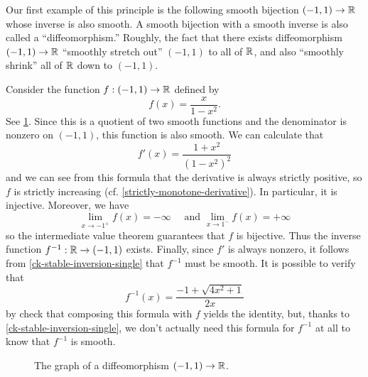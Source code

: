 Our first example of this principle is the following smooth bijection $(-1,1) \to \mathbb{R}$ whose inverse is also smooth. A smooth bijection with a smooth inverse is also called a ``diffeomorphism.'' Roughly, the fact that there exists diffeomorphism $(-1,1) \to \mathbb{R}$ ``smoothly stretch out'' $(-1,1)$ to all of $\mathbb{R}$, and also ``smoothly shrink'' all of $\mathbb{R}$ down to $(-1,1)$. 

\begin{example} \label{interval-to-line}
	Consider the function $f : (-1,1) \to \mathbb{R}$ defined by \[ f(x) = \frac{x}{1-x^2}. \]
	See \cref{interval-to-line-graph}. 
	Since this is a quotient of two smooth functions and the denominator is nonzero on $(-1,1)$, this function is also smooth. We can calculate that
	\[ f'(x) = \frac{1+x^2}{(1-x^2)^2} \]
	and we can see from this formula that the derivative is always strictly positive, so $f$ is strictly increasing (cf. \cref{strictly-monotone-derivative}). In particular, it is injective. Moreover, we have
	\[ \lim_{x \to -1^+} f(x) = -\infty \quad \text{ and } \lim_{x \to 1^-} f(x) = +\infty \]
	so the intermediate value theorem guarantees that $f$ is bijective. Thus the inverse function $f^{-1} : \mathbb{R} \to (-1,1)$ exists. Finally, since $f'$ is always nonzero, it follows from \cref{ck-stable-inversion-single} that $f^{-1}$ must be smooth. It is possible to verify that
	\[ f^{-1}(x) = \frac{-1+\sqrt{4x^2+1}}{2x} \]
	by check that composing this formula with $f$ yields the identity, but, thanks to \cref{ck-stable-inversion-single}, we don't actually need this formula for $f^{-1}$ at all to know that $f^{-1}$ is smooth.
\end{example}


\begin{figure}
	\begin{center}
	\end{center}
	\caption{The graph of a diffeomorphism $(-1,1) \to \mathbb{R}$.}  \label{interval-to-line-graph}
\end{figure}

